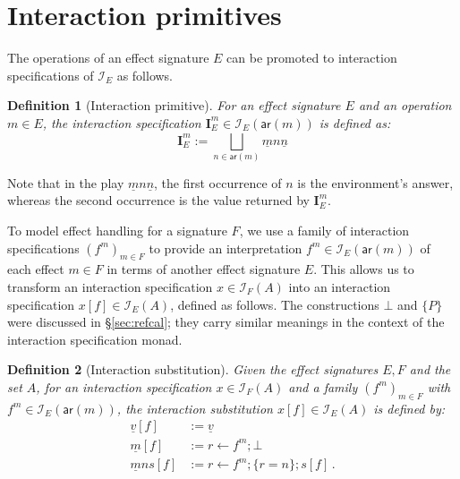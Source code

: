 \documentclass[draft,11pt]{report}
\newtheorem{definition}{Definition}
\newcommand{\kw}[1]{\ensuremath{ \mathsf{#1} }}
\begin{document}

\section{Interaction primitives} %

The operations of an effect signature $E$
can be promoted to interaction specifications of $\mathcal{I}_E$
as follows.

\begin{definition}[Interaction primitive]
For an effect signature $E$ and
an operation $m \in E$,
the interaction specification
$\mathbf{I}_E^m \in \mathcal{I}_E(\kw{ar}(m))$
is defined as:
\[
  \mathbf{I}_E^m :=
    \bigsqcup_{n \in \kw{ar}(m)} \underline{m} n \underline{n}
\]
\end{definition}
Note that in the play $\underline{m} n \underline{n}$,
the first occurrence of $n$ is the environment's answer,
whereas the second occurrence is the value returned by $\mathbf{I}_E^m$.

To model effect handling for a signature $F$,
we use a family of interaction specifications
$(f^m)_{m \in F}$
to provide an interpretation $f^m \in \mathcal{I}_E(\kw{ar}(m))$
of each effect $m \in F$
in terms of another effect signature $E$.
This allows us to transform an interaction specification
$x \in \mathcal{I}_F(A)$
into an interaction specification
$x[f] \in \mathcal{I}_E(A)$,
defined as follows.
The constructions $\bot$ and $\{P\}$ were discussed in \S\ref{sec:refcal};
they carry similar meanings in the context of the
interaction specification monad.

\begin{definition}[Interaction substitution]
Given the effect signatures $E, F$ and the set $A$,
for an interaction specification $x \in \mathcal{I}_F(A)$
and a family $(f^m)_{m \in F}$ with $f^m \in \mathcal{I}_E(\kw{ar}(m))$,
the \emph{interaction substitution} $x[f] \in \mathcal{I}_E(A)$
is defined by:
\begin{align*}
  \underline{v}[f] &:= \underline{v} \\
  \underline{m}[f] &:= r \leftarrow f^m ; \bot \\
  \underline{m}ns[f] &:= r \leftarrow f^m ; \{r = n\} ; s[f] \,.
\end{align*}
\end{definition}

\end{document}
